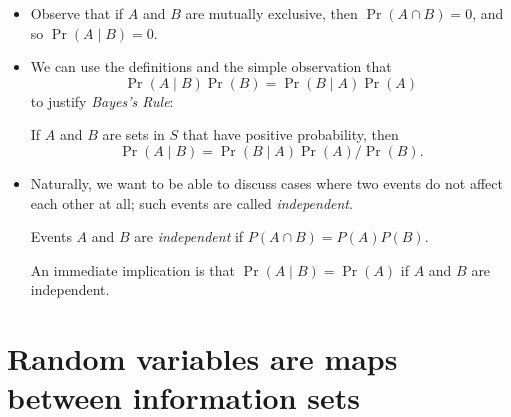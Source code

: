 \begin{itemize}[leftmargin=0pt]
\item Observe that if $A$ and $B$ are mutually exclusive, then $\Pr(A
  \cap B) = 0$, and so $\Pr(A \mid B) = 0$.

\item We can use the definitions and the simple observation that
  \begin{equation*}
    \Pr(A \mid B) \Pr(B) = \Pr(B \mid A) \Pr(A)
  \end{equation*}
  to justify \emph{Bayes's Rule}:
  \begin{thm}
    If $A$ and $B$ are sets in $S$ that have positive probability, then
    \begin{equation*}
      \Pr(A \mid B) = \Pr(B \mid A) \Pr(A) / \Pr(B).
    \end{equation*}
  \end{thm}

\item Naturally, we want to be able to discuss cases where two events
  do not affect each other at all; such events are called
  \emph{independent}.

  \begin{defn}
    Events $A$ and $B$ are \emph{independent} if $P(A \cap B) = P(A)
    P(B)$.
  \end{defn}

  An immediate implication is that $\Pr(A \mid B) = \Pr(A)$ if $A$ and
  $B$ are independent.

\end{itemize}

\section{Random variables are maps between information sets}

